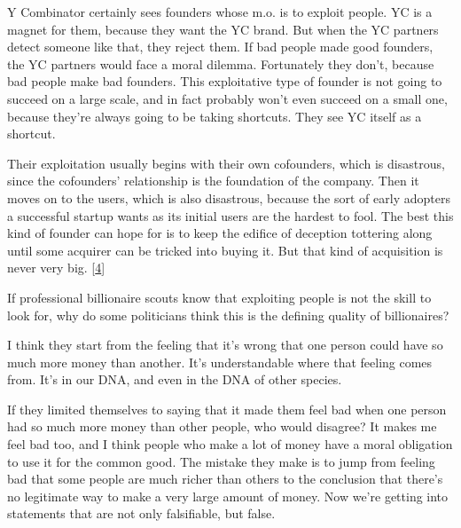 Y Combinator certainly sees founders whose m.o.
                  is to exploit people. YC is a magnet for them, because they
                  want the YC brand. But when the YC partners detect someone
                  like that, they reject them. If bad people made good founders,
                  the YC partners would face a moral dilemma. Fortunately they
                  don't, because bad people make bad founders. This exploitative
                  type of founder is not going to succeed on a large scale, and
                  in fact probably won't even succeed on a small one, because
                  they're always going to be taking shortcuts. They see YC
                  itself as a shortcut.

Their exploitation usually
                  begins with their own cofounders, which is disastrous, since
                  the cofounders' relationship is the foundation of the company.
                  Then it moves on to the users, which is also disastrous,
                  because the sort of early adopters a successful startup wants
                  as its initial users are the hardest to fool. The best this
                  kind of founder can hope for is to keep the edifice of
                  deception tottering along until some acquirer can be tricked
                  into buying it. But that kind of acquisition is never very
                  big.
                  [\href{\#f4n}{4}]

If professional billionaire scouts know that
                  exploiting people is not the skill to look for, why do some
                  politicians think this is the defining quality of
                  billionaires?

I think they start from the feeling
                  that it's wrong that one person could have so much more money
                  than another. It's understandable where that feeling comes
                  from. It's in our DNA, and even in the DNA of other
                  species.

If they limited themselves to saying that
                  it made them feel bad when one person had so much more money
                  than other people, who would disagree? It makes me feel bad
                  too, and I think people who make a lot of money have a moral
                  obligation to use it for the common good. The mistake they
                  make is to jump from feeling bad that some people are much
                  richer than others to the conclusion that there's no
                  legitimate way to make a very large amount of money. Now we're
                  getting into statements that are not only falsifiable, but
                  false.

